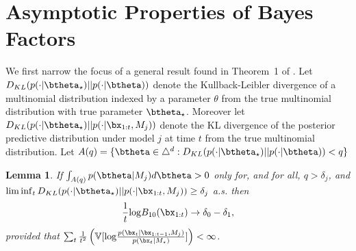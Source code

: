 \documentclass[11pt]{article}
\def\log{{\rm log}}
\newtheorem{lemma}{Lemma}[section]
\begin{document}
\section{Asymptotic Properties of Bayes Factors}
\label{app:asymptotics}
We first narrow the focus of a general result found in Theorem~1 of \cite{walker}.
Let $D_{KL}(p(\cdot|\btheta_\star)||p(\cdot|\btheta) )$ denote the Kullback-Leibler divergence of a multinomial distribution indexed by a parameter $\theta$ from the true multinomial distribution with true parameter $\btheta_{\star}$.
Moreover let $D_{KL}(p(\cdot|\btheta_\star)||p(\cdot|\bx_{1:t}, M_j) )$ denote the KL divergence of the posterior predictive distribution under model $j$ at time $t$ from the true multinomial distribution.
Let $A(q) = \lbrace \btheta \in \triangle^d : D_{KL}(p(\cdot|\btheta_\star)||p(\cdot|\btheta) ) < q \rbrace$
\begin{lemma}
  \label{lemma:walker}
  If $\int_{A(q)} p(\btheta|M_j) d\btheta > 0$ only for, and for all, $q > \delta_j$, and $\lim \inf_t D_{KL}(p(\cdot|\btheta_\star)||p(\cdot|\bx_{1:t}, M_j) ) \geq \delta_j$ a.s.
then
  \begin{equation}
    \label{eq:bayes_factor_convergence}
    \frac{1}{t} \log B_{10}(\bx_{1:t}) \rightarrow \delta_0 - \delta_1,
  \end{equation}
  provided that $\sum_t \frac{1}{t^2} \left( \mathbb{V}[\log \frac{p(\bx_t|\bx_{1:t-1},M_j)}{p(\bx_t|M_\star )}]\right) < \infty$.
\end{lemma}
\end{document}
